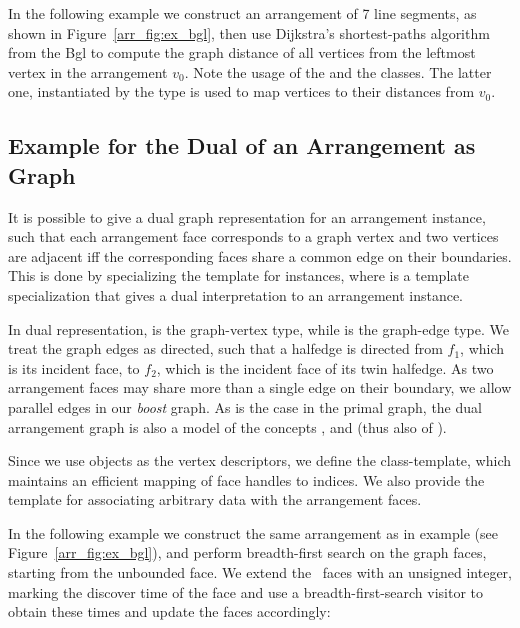 In the following example we construct an arrangement of 7 line segments,
as shown in Figure~\ref{arr_fig:ex_bgl},
then use Dijkstra's shortest-paths algorithm from the {\sc Bgl} to compute
the graph distance of all vertices from the leftmost vertex in the
arrangement $v_0$. Note the usage of the  and
the  classes. The latter one, instantiated by
the type  is used to map vertices to their distances from $v_0$.


\subsection{Example for the Dual of an Arrangement as Graph\label{arr_sssec:bgl_dual}}

It is possible to give a dual graph representation for an arrangement instance,
such that each arrangement face corresponds to a graph vertex and two vertices
are adjacent iff the corresponding faces share a common edge on their
boundaries. This is done by specializing the
 template for  instances,
where  is a template specialization that gives a
dual interpretation to an arrangement instance.

In dual representation, 
is the graph-vertex type, while  is the
graph-edge type. We treat the graph edges as directed, such that a halfedge
 is directed from $f_1$, which is its incident face, to $f_2$, which
is the incident face of its twin halfedge. As two arrangement faces may
share more than a single edge on their boundary, we allow parallel
edges in our {\em boost} graph. As is the case in the primal graph, the dual
arrangement graph is also a model of the concepts ,
 and  (thus also of 
).

Since we use  objects as the vertex descriptors, we define
the  class-template, which maintains an
efficient mapping of face handles to indices. We also provide the template
 for associating arbitrary
data with the arrangement faces.

In the following example we construct the same arrangement as in
example  (see Figure~\ref{arr_fig:ex_bgl}),
and perform breadth-first search on the graph faces, starting from the
unbounded face. We extend the \dcel\ faces
with an unsigned integer, marking the discover time of the face and use a
breadth-first-search visitor to obtain these times and update the faces
accordingly:





